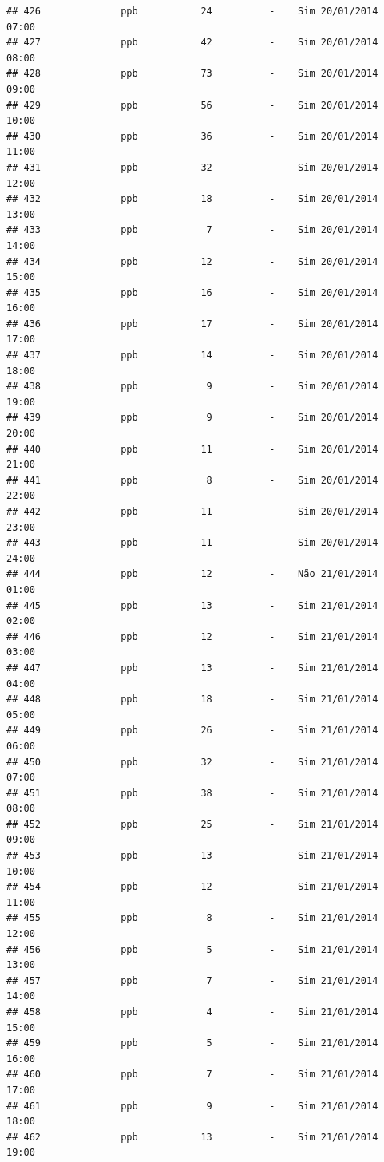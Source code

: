 \documentclass[]{book}
\begin{document}
\begin{verbatim}
## 426              ppb           24          -    Sim 20/01/2014 07:00
## 427              ppb           42          -    Sim 20/01/2014 08:00
## 428              ppb           73          -    Sim 20/01/2014 09:00
## 429              ppb           56          -    Sim 20/01/2014 10:00
## 430              ppb           36          -    Sim 20/01/2014 11:00
## 431              ppb           32          -    Sim 20/01/2014 12:00
## 432              ppb           18          -    Sim 20/01/2014 13:00
## 433              ppb            7          -    Sim 20/01/2014 14:00
## 434              ppb           12          -    Sim 20/01/2014 15:00
## 435              ppb           16          -    Sim 20/01/2014 16:00
## 436              ppb           17          -    Sim 20/01/2014 17:00
## 437              ppb           14          -    Sim 20/01/2014 18:00
## 438              ppb            9          -    Sim 20/01/2014 19:00
## 439              ppb            9          -    Sim 20/01/2014 20:00
## 440              ppb           11          -    Sim 20/01/2014 21:00
## 441              ppb            8          -    Sim 20/01/2014 22:00
## 442              ppb           11          -    Sim 20/01/2014 23:00
## 443              ppb           11          -    Sim 20/01/2014 24:00
## 444              ppb           12          -    Não 21/01/2014 01:00
## 445              ppb           13          -    Sim 21/01/2014 02:00
## 446              ppb           12          -    Sim 21/01/2014 03:00
## 447              ppb           13          -    Sim 21/01/2014 04:00
## 448              ppb           18          -    Sim 21/01/2014 05:00
## 449              ppb           26          -    Sim 21/01/2014 06:00
## 450              ppb           32          -    Sim 21/01/2014 07:00
## 451              ppb           38          -    Sim 21/01/2014 08:00
## 452              ppb           25          -    Sim 21/01/2014 09:00
## 453              ppb           13          -    Sim 21/01/2014 10:00
## 454              ppb           12          -    Sim 21/01/2014 11:00
## 455              ppb            8          -    Sim 21/01/2014 12:00
## 456              ppb            5          -    Sim 21/01/2014 13:00
## 457              ppb            7          -    Sim 21/01/2014 14:00
## 458              ppb            4          -    Sim 21/01/2014 15:00
## 459              ppb            5          -    Sim 21/01/2014 16:00
## 460              ppb            7          -    Sim 21/01/2014 17:00
## 461              ppb            9          -    Sim 21/01/2014 18:00
## 462              ppb           13          -    Sim 21/01/2014 19:00

\end{verbatim}
\end{document}
